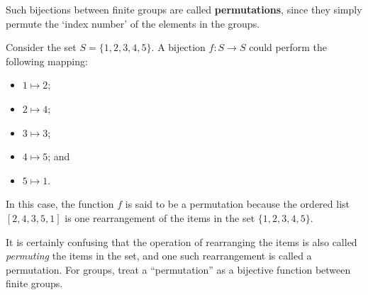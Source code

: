 Such bijections between finite groups are called \textbf{permutations}, since they simply permute the `index number' of the elements in the groups.

\begin{example}
    Consider the set $S = \{1, 2, 3, 4, 5\}$. A bijection $f: S \to S$ could perform the following mapping:
    \begin{itemize}
        \item $1 \mapsto 2$;
        \item $2 \mapsto 4$;
        \item $3 \mapsto 3$;
        \item $4 \mapsto 5$; and
        \item $5 \mapsto 1$.
    \end{itemize}
    In this case, the function $f$ is said to be a permutation because the ordered list $[2, 4, 3, 5, 1]$ is one rearrangement of the items in the set $\{1, 2, 3, 4, 5\}$.
\end{example}

\begin{remark}
    It is certainly confusing that the operation of rearranging the items is also called \textit{permuting} the items in the set, and one such rearrangement is called a permutation. For groups, treat a ``permutation'' as a bijective function between finite groups.
\end{remark}

